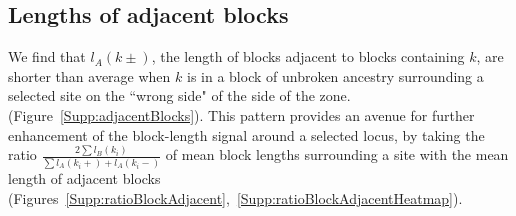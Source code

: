 \documentclass[11pt,letterpaper]{article}
\begin{document}
\subsection*{Lengths of adjacent blocks}
We find that $l_A(k\pm)$, the length of blocks adjacent to blocks containing $k$, are shorter than average when $k$ is in a block of unbroken ancestry surrounding a selected site on the ``wrong side" of the side of the zone.  (Figure~\ref{Supp:adjacentBlocks}). This pattern provides an avenue for further enhancement of the block-length signal around a selected locus, by taking the ratio $\frac{2\sum{l_B(k_i)}}{\sum{l_A(k_i+)+l_A(k_i-)}}$ of mean block lengths surrounding a site with the mean length of adjacent blocks (Figures~\ref{Supp:ratioBlockAdjacent},~\ref{Supp:ratioBlockAdjacentHeatmap}).





\end{document}
